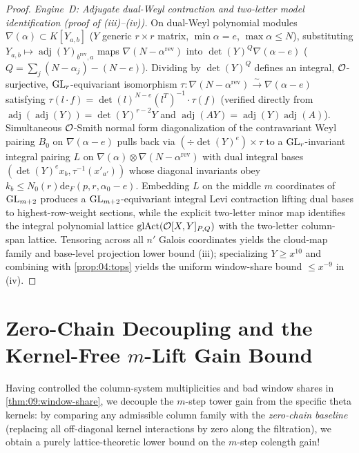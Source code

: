 \begin{proof}
\medskip\noindent
\emph{Engine~D: Adjugate dual-Weyl contraction and two-letter model identification (proof of (iii)--(iv)).}
On dual-Weyl polynomial modules $\nabla(\alpha) \subset K[Y_{a,b}]$ ($Y$ generic $r \times r$ matrix, $\min\alpha = e$, $\max\alpha \le N$), substituting $Y_{a,b} \mapsto \operatorname{adj}(Y)_{b^{\mathrm{rev}}, a}$ maps $\nabla(N - \alpha^{\mathrm{rev}})$ into $\det(Y)^Q \nabla(\alpha - e)$ ($Q = \sum_j(N - \alpha_j) - (N - e)$). Dividing by $\det(Y)^Q$ defines an integral, $\mathcal{O}$-surjective, $\mathrm{GL}_r$-equivariant isomorphism $\tau : \nabla(N - \alpha^{\mathrm{rev}}) \xrightarrow{\sim} \nabla(\alpha - e)$ satisfying $\tau(l\cdot f) = \det(l)^{N-e}(l^T)^{-1}\cdot \tau(f)$ (verified directly from $\operatorname{adj}(\operatorname{adj}(Y)) = \det(Y)^{r-2} Y$ and $\operatorname{adj}(AY) = \operatorname{adj}(Y)\operatorname{adj}(A)$).
Simultaneous $\mathcal{O}$-Smith normal form diagonalization of the contravariant Weyl pairing $B_0$ on $\nabla(\alpha - e)$ pulls back via $(\div \det(Y)^e) \times \tau$ to a $\mathrm{GL}_r$-invariant integral pairing $L$ on $\nabla(\alpha) \otimes \nabla(N - \alpha^{\mathrm{rev}})$ with dual integral bases $(\det(Y)^e x_b, \tau^{-1}(x'_{a'}))$ whose diagonal invariants obey $k_b \le N_0(r)\mathrm{de}_F(p, r, \alpha_0 - e)$. Embedding $L$ on the middle $m$ coordinates of $\mathrm{GL}_{m+2}$ produces a $\mathrm{GL}_{m+2}$-equivariant integral Levi contraction lifting dual bases to highest-row-weight sections, while the explicit two-letter minor map identifies the integral polynomial lattice $\mathrm{glAct}(\mathcal{O}[X,Y]_{P,Q})$ with the two-letter column-span lattice. Tensoring across all $n'$ Galois coordinates yields the cloud-map family and base-level projection lower bound (iii); specializing $Y \ge x^{10}$ and combining with \cref{prop:04:tops} yields the uniform window-share bound $\le x^{-9}$ in (iv).
\end{proof}

\section{Zero-Chain Decoupling and the Kernel-Free $m$-Lift Gain Bound}
\label{sec:09:kernel-free}

Having controlled the column-system multiplicities and bad window shares in \cref{thm:09:window-share}, we decouple the $m$-step tower gain from the specific theta kernels: by comparing any admissible column family with the \emph{zero-chain baseline} (replacing all off-diagonal kernel interactions by zero along the filtration), we obtain a purely lattice-theoretic lower bound on the $m$-step colength gain!

